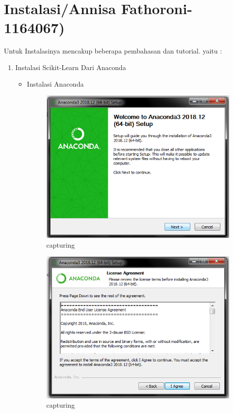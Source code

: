 \section{Instalasi/Annisa Fathoroni-1164067)}
Untuk Instalasinya mencakup beberapa pembahasan dan tutorial. yaitu :
\begin{enumerate}
\item Instalasi Scikit-Learn Dari Anaconda 
\begin{itemize}
\item Instalasi Anaconda
\begin{figure}[ht]
\centering
\includegraphics[scale=0.5]{figures/1.png}
\caption{capturing}
\label{proses instalasi}
\end{figure}

\begin{figure}[ht]
\centering
\includegraphics[scale=0.5]{figures/2.png}
\caption{capturing}
\label{proses instalasi}
\end{figure}


\end{itemize}
\end{enumerate}

